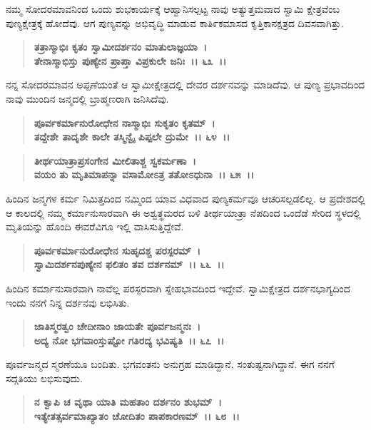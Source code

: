 ನಮ್ಮ ಸೋದರಮಾವನಿಂದ ಒಂದು ಶುಭಕಾರ್ಯಕ್ಕೆ ಆಹ್ವಾನಿಸಲ್ಪಟ್ಟ ನಾವು ಅತ್ಯುತ್ತಮವಾದ ಸ್ವಾಮಿ ಕ್ಷೇತ್ರವೆಂಬ ಪುಣ್ಯಕ್ಷೇತ್ರಕ್ಕೆ ಹೋದೆವು. ಆಗ ಪುಣ್ಯವನ್ನು ಅಭಿವೃದ್ಧಿ ಮಾಡುವ ಕಾತಿ೯ಕಮಾಸದ ಕೃತ್ತಿಕಾನಕ್ಷತ್ರದ ದಿವಸವಾಗಿತ್ತು.

\begin{verse}
\textbf{ತತ್ರಾಸ್ಮಾಭಿಃ ಕೃತಂ ಸ್ವಾಮೀದರ್ಶನಂ ಮಾತುಲಾಜ್ಞಯಾ~।}\\\textbf{ತೇನಾಸ್ಮಾಭಿಸ್ತು ಪುಣ್ಯೇನ ಪ್ರಾಪ್ತಾ ವಿಪ್ರಕುಲೇ ಜನಿಃ~।। ೬೩~।।}
\end{verse}

ನನ್ನ ಸೋದರಮಾವನ ಅಪ್ಪಣೆಯಂತೆ ಆ ಸ್ವಾಮೀಕ್ಷೇತ್ರದಲ್ಲಿ ದೇವರ ದರ್ಶನವನ್ನು ಮಾಡಿದೆವು. ಆ ಪುಣ್ಯ ಪ್ರಭಾವದಿಂದ ನಾವು ಮುಂದಿನ ಜನ್ಮದಲ್ಲಿ ಬ್ರಾಹ್ಮಣರಾಗಿ ಜನಿಸಿದೆವು.

\begin{verse}
\textbf{ಪೂರ್ವಕರ್ಮಾನುರೋಧೇನ ನಾಸ್ಮಾಭಿಃ ಸುಕೃತಂ ಕೃತಮ್~।}\\\textbf{ತದ್ದೇಶೇ ತಾದೃಶೇ ಕಾಲೇ ತಸ್ಮಿನ್ವೈ ಪಿಪ್ಪಲೇ ದ್ರುಮೇ~।। ೬೪~।। }
\end{verse}

\begin{verse}
\textbf{ತೀರ್ಥಯಾತ್ರಾಪ್ರಸಂಗೇನ ಮೀಲಿತಾಶ್ಚ ಸ್ವಕರ್ಮಣಾ~।}\\\textbf{ವಯಂ ತು ಮೃತಿಮಾಪನ್ನಾ ವಸಾಮೋಽತ್ರ ತತೋಽಧುನಾ~।। ೬೫~।।}
\end{verse}

ಹಿಂದಿನ ಜನ್ಮಗಳ ಕರ್ಮ ನಿಮಿತ್ತದಿಂದ ನಮ್ಮಿಂದ ಯಾವ ವಿಧವಾದ ಪುಣ್ಯಕರ್ಮವೂ ಆಚರಿಸಲ್ಪಡಲಿಲ್ಲ. ಆ ಪ್ರದೇಶದಲ್ಲಿ ಆ ಕಾಲದಲ್ಲಿ ನಮ್ಮ ಕರ್ಮಾನುಸಾರವಾಗಿ ಈ ಅಶ್ವತ್ಥಮರದ ಬಳಿ ತೀರ್ಥಯಾತ್ರಾ ನೆಪದಿಂದ ಒಂದೆಡೆ ಸೇರಿದ ಸ್ಥಳದಲ್ಲಿ ಮೃತಿಯನ್ನು ಹೊಂದಿ ಈವರೆವಿಗೂ ಇಲ್ಲಿ ವಾಸಿಸುತ್ತಿದ್ದೇವೆ.

\begin{verse}
\textbf{ಪೂರ್ವಕರ್ಮಾನುರೋಧೇನ ಸುಹೃದಶ್ಚ ಪರಸ್ಪರಮ್~।}\\\textbf{ಸ್ವಾಮಿದರ್ಶನಪುಣ್ಯೇನ ಫಲಿತಂ ತವ ದರ್ಶನಮ್~।। ೬೬~।।}
\end{verse}

ಹಿಂದಿನ ಕರ್ಮಾನುಸಾರವಾಗಿ ನಾವೆಲ್ಲ ಪರಸ್ಪರವಾಗಿ ಸ್ನೇಹಭಾವದಿಂದ ಇದ್ದೇವೆ. ಸ್ವಾಮಿಕ್ಷೇತ್ರದ ದರ್ಶನಭಾಗ್ಯದಿಂದ ಇಂದು ನನಗೆ ನಿನ್ನ ದರ್ಶನವು ಲಭಿಸಿತು.

\begin{verse}
\textbf{ಜಾತಿಸ್ಮರತ್ವಂ ಚೇದೀನಾಂ ಜಾಯತೇ ಪೂರ್ವಜನ್ಮನಃ~।}\\\textbf{ಅದ್ಯ ನೋ ಭಗವಾಂಸ್ತುಷ್ಟೋ ಗತಿರದ್ಯ ಭವಿಷ್ಯತಿ~।। ೬೭~।।}
\end{verse}

ಪೂರ್ವಜನ್ಮದ ಸ್ಮರಣೆಯೂ ಬಂದಿತು. ಭಗವಂತನು ಅನುಗ್ರಹ ಮಾಡಿದ್ದಾನೆ, ಸಂತುಷ್ಟನಾಗಿದ್ದಾನೆ. ಈಗ ನನಗೆ ಸದ್ಗತಿಯು ಲಭಿಸುವುದು.

\begin{verse}
\textbf{ನ ಕ್ವಾಪಿ ಚ ವೃಥಾ ಯಾತಿ ಮಹತಾಂ ದರ್ಶನಂ ಶುಭಮ್~।}\\\textbf{ಇತ್ಯೇತತ್ಸರ್ವಮಾಖ್ಯಾತಂ ಚೋದಿತಂ ಪಾಪಕಾರಣಮ್~।। ೬೮~।।} 
\end{verse}

